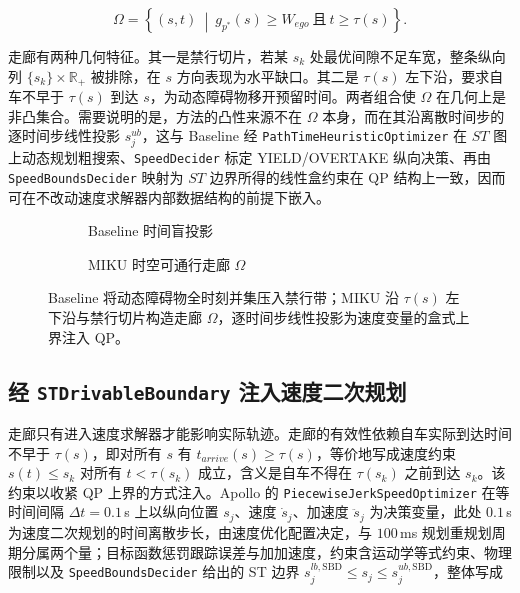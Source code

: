 \documentclass[a4paper,11pt]{ctexart}
\theoremstyle{definition}
\begin{document}
\begin{equation}
    \Omega = \left\{ (s,t) \ \middle|\ g_{p^{*}}(s) \geq W_{ego}\ \text{且}\ t \geq \tau(s) \right\}.
    \label{eq:st_corridor}
\end{equation}

走廊有两种几何特征。其一是禁行切片，若某 $s_k$ 处最优间隙不足车宽，整条纵向列 $\{s_k\}\times\mathbb{R}_{+}$ 被排除，在 $s$ 方向表现为水平缺口。其二是 $\tau(s)$ 左下沿，要求自车不早于 $\tau(s)$ 到达 $s$，为动态障碍物移开预留时间。两者组合使 $\Omega$ 在几何上是非凸集合。需要说明的是，方法的凸性来源不在 $\Omega$ 本身，而在其沿离散时间步的逐时间步线性投影 $s_j^{ub}$，这与 Baseline 经 \texttt{PathTimeHeuristicOptimizer} 在 $ST$ 图上动态规划粗搜索、\texttt{SpeedDecider} 标定 YIELD/OVERTAKE 纵向决策、再由 \texttt{SpeedBoundsDecider} 映射为 $ST$ 边界所得的线性盒约束在 QP 结构上一致，因而可在不改动速度求解器内部数据结构的前提下嵌入。

\begin{figure}[htbp]
\centering
\begin{subfigure}[b]{0.46\textwidth}
  \centering
  \caption{Baseline 时间盲投影}
\end{subfigure}\hfill
\begin{subfigure}[b]{0.46\textwidth}
  \centering
  \caption{MIKU 时空可通行走廊 $\Omega$}
\end{subfigure}
\caption{ST 平面上的时空可通行走廊与上界收紧}
\caption*{Baseline 将动态障碍物全时刻并集压入禁行带；MIKU 沿 $\tau(s)$ 左下沿与禁行切片构造走廊 $\Omega$，逐时间步线性投影为速度变量的盒式上界注入 QP。}
\label{fig:corridor}
\end{figure}

\subsection{经 \texttt{STDrivableBoundary} 注入速度二次规划}
\label{sec:method_inject}

走廊只有进入速度求解器才能影响实际轨迹。走廊的有效性依赖自车实际到达时间不早于 $\tau(s)$，即对所有 $s$ 有 $t_{arrive}(s)\geq\tau(s)$，等价地写成速度约束 $s(t)\leq s_k$ 对所有 $t<\tau(s_k)$ 成立，含义是自车不得在 $\tau(s_k)$ 之前到达 $s_k$。该约束以收紧 QP 上界的方式注入。Apollo 的 \texttt{PiecewiseJerkSpeedOptimizer} 在等时间间隔 $\Delta t = 0.1$\,s 上以纵向位置 $s_j$、速度 $\dot{s}_j$、加速度 $\ddot{s}_j$ 为决策变量，此处 $0.1$\,s 为速度二次规划的时间离散步长，由速度优化配置决定，与 $100$\,ms 规划重规划周期分属两个量；目标函数惩罚跟踪误差与加加速度，约束含运动学等式约束、物理限制以及 \texttt{SpeedBoundsDecider} 给出的 ST 边界 $s_j^{lb,\mathrm{SBD}} \leq s_j \leq s_j^{ub,\mathrm{SBD}}$，整体写成
\end{document}
